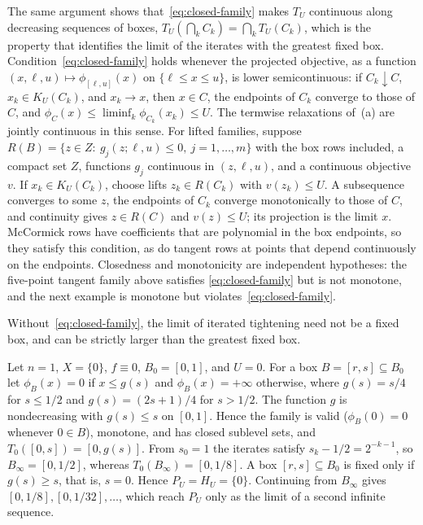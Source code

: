 The same argument shows that~\eqref{eq:closed-family} makes $T_U$
continuous along decreasing sequences of boxes,
$T_U(\bigcap_kC_k)=\bigcap_kT_U(C_k)$, which is the property that
identifies the limit of the iterates with the greatest fixed box.
Condition~\eqref{eq:closed-family} holds whenever the projected objective,
as a function $(x,\ell,u)\mapsto\phi_{[\ell,u]}(x)$ on
$\{\ell\le x\le u\}$, is lower semicontinuous: if $C_k\downarrow C$,
$x_k\in K_U(C_k)$, and $x_k\to x$, then $x\in C$, the endpoints of $C_k$
converge to those of $C$, and
$\phi_C(x)\le\liminf_k\phi_{C_k}(x_k)\le U$. The termwise relaxations
of~(a) are jointly continuous in this sense. For lifted families, suppose
$R(B)=\{z\in Z:\ g_j(z;\ell,u)\le0,\ j=1,\dots,m\}$
with the box rows included, a compact set $Z$, functions $g_j$ continuous
in $(z,\ell,u)$, and a continuous objective $v$. If $x_k\in K_U(C_k)$,
choose lifts $z_k\in R(C_k)$ with $v(z_k)\le U$. A subsequence converges
to some $z$, the endpoints of $C_k$ converge monotonically to those of $C$,
and continuity gives $z\in R(C)$ and $v(z)\le U$; its projection is the
limit $x$. McCormick rows have coefficients that are polynomial in the box
endpoints, so they satisfy this condition, as do tangent rows at points
that depend continuously on the endpoints. Closedness and monotonicity are
independent hypotheses: the five-point tangent family above satisfies
\eqref{eq:closed-family} but is not monotone, and the next example is
monotone but violates~\eqref{eq:closed-family}.

Without~\eqref{eq:closed-family}, the limit of iterated tightening need not
be a fixed box, and can be strictly larger than the greatest fixed box.

\begin{example}\label{ex:not-fixed}
Let $n=1$, $X=\{0\}$, $f\equiv0$, $B_0=[0,1]$, and $U=0$. For a box
$B=[r,s]\subseteq B_0$ let $\phi_B(x)=0$ if $x\le g(s)$ and $\phi_B(x)=+\infty$
otherwise, where $g(s)=s/4$ for $s\le1/2$ and $g(s)=(2s+1)/4$ for $s>1/2$.
The function $g$ is nondecreasing with $g(s)\le s$ on $[0,1]$. Hence the
family is valid ($\phi_B(0)=0$ whenever $0\in B$), monotone, and has closed
sublevel sets, and $T_0([0,s])=[0,g(s)]$. From $s_0=1$ the iterates satisfy
$s_k-1/2=2^{-k-1}$, so $B_\infty=[0,1/2]$, whereas
$T_0(B_\infty)=[0,1/8]$. A box $[r,s]\subseteq B_0$ is fixed only if
$g(s)\ge s$, that is, $s=0$. Hence $P_U=H_U=\{0\}$. Continuing from
$B_\infty$ gives $[0,1/8],[0,1/32],\dots$, which reach $P_U$ only as the
limit of a second infinite sequence.
\end{example}

